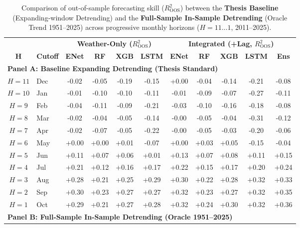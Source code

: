 \begin{table}[htbp]
\centering
\singlespacing
\footnotesize
\setlength{\tabcolsep}{3.0pt}
\caption{Comparison of out-of-sample forecasting skill ($R^2_{\text{OOS}}$) between the \textbf{Thesis Baseline} (Expanding-window Detrending) and the \textbf{Full-Sample In-Sample Detrending} (Oracle Trend 1951--2025) across progressive monthly horizons ($H = 11 \dots 1$, 2011--2025).}
\label{tab:comp_horizon_performance}
\begin{tabular*}{\textwidth}{@{\extracolsep{\fill}} c l cccc ccccc @{}}
\toprule
& & \multicolumn{4}{c}{\textbf{Weather-Only ($R^2_{\text{OOS}}$)}} & \multicolumn{5}{c}{\textbf{Integrated (+Lag, $R^2_{\text{OOS}}$)}} \\
\cmidrule(lr){3-6}\cmidrule(lr){7-11}
\textbf{H} & \textbf{Cutoff} & \textbf{ENet} & \textbf{RF} & \textbf{XGB} & \textbf{LSTM} & \textbf{ENet} & \textbf{RF} & \textbf{XGB} & \textbf{LSTM} & \textbf{Ens} \\
\midrule
\multicolumn{11}{l}{\textbf{Panel A: Baseline Expanding Detrending (Thesis Standard)}} \\
$H=11$ & Dec & -0.02 & -0.05 & -0.19 & -0.15 & +0.00 & -0.04 & -0.14 & -0.21 & -0.08 \\
$H=10$ & Jan & -0.01 & -0.10 & -0.10 & -0.11 & -0.01 & -0.09 & -0.07 & -0.27 & -0.11 \\
$H=9$ & Feb & -0.04 & -0.11 & -0.09 & -0.21 & -0.03 & -0.10 & -0.16 & -0.18 & -0.08 \\
$H=8$ & Mar & -0.02 & -0.04 & -0.05 & -0.14 & -0.00 & -0.05 & -0.04 & -0.31 & -0.12 \\
$H=7$ & Apr & -0.02 & -0.07 & -0.05 & -0.22 & -0.00 & -0.05 & -0.03 & -0.20 & -0.06 \\
$H=6$ & May & +0.00 & +0.00 & +0.01 & -0.07 & +0.00 & +0.03 & +0.05 & -0.15 & -0.04 \\
$H=5$ & Jun & +0.11 & +0.07 & +0.06 & +0.01 & +0.13 & +0.07 & +0.08 & +0.11 & +0.15 \\
$H=4$ & Jul & +0.21 & +0.12 & +0.16 & +0.17 & +0.22 & +0.15 & +0.17 & +0.20 & +0.24 \\
$H=3$ & Aug & +0.28 & +0.21 & +0.25 & +0.29 & +0.30 & +0.22 & +0.28 & +0.32 & +0.33 \\
$H=2$ & Sep & +0.30 & +0.23 & +0.27 & +0.27 & +0.32 & +0.23 & +0.27 & +0.32 & +0.35 \\
$H=1$ & Oct & +0.29 & +0.21 & +0.27 & +0.28 & +0.32 & +0.24 & +0.30 & +0.32 & +0.36 \\
\midrule
\multicolumn{11}{l}{\textbf{Panel B: Full-Sample In-Sample Detrending (Oracle 1951--2025)}} \\

\end{tabular*}
\end{table}
